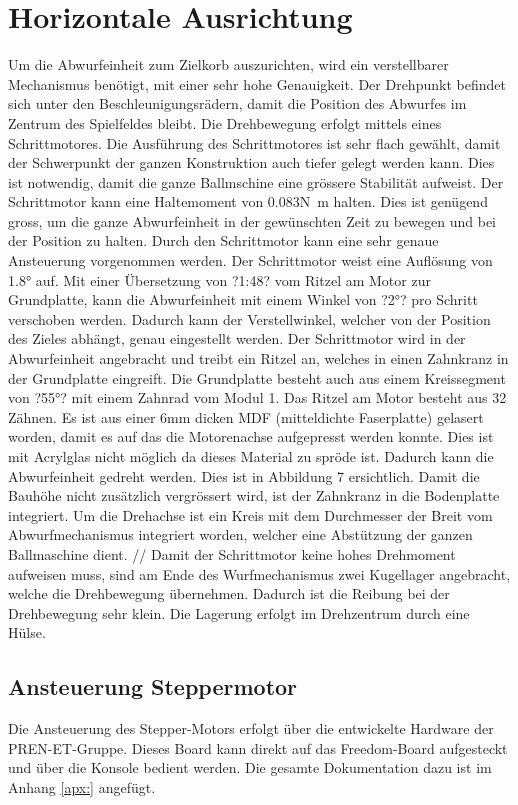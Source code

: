 \section{Horizontale Ausrichtung}

Um die Abwurfeinheit zum Zielkorb auszurichten, wird ein verstellbarer Mechanismus benötigt, mit einer sehr hohe Genauigkeit. Der Drehpunkt befindet sich unter den Beschleunigungsrädern, damit die Position des Abwurfes im Zentrum des Spielfeldes bleibt. Die Drehbewegung erfolgt mittels eines Schrittmotores. Die Ausführung des Schrittmotores ist sehr flach gewählt, damit der Schwerpunkt der ganzen Konstruktion auch tiefer gelegt werden kann. Dies ist notwendig, damit die ganze Ballmschine eine grössere Stabilität aufweist. Der Schrittmotor kann eine Haltemoment von 0.083\si{\newton\meter} halten. Dies ist genügend gross, um die ganze Abwurfeinheit in der gewünschten Zeit zu bewegen und bei der Position zu halten. Durch den Schrittmotor kann eine sehr genaue Ansteuerung vorgenommen werden. Der Schrittmotor weist eine Auflösung von 1.8\si{\degree} auf. Mit einer Übersetzung von ?1:48? vom Ritzel am Motor zur Grundplatte, kann die Abwurfeinheit mit einem Winkel von ?2°? pro Schritt verschoben werden. Dadurch kann der Verstellwinkel, welcher von der Position des Zieles abhängt, genau eingestellt werden. Der Schrittmotor wird in der Abwurfeinheit angebracht und treibt ein Ritzel an, welches in einen Zahnkranz in der Grundplatte eingreift. Die Grundplatte besteht auch aus einem Kreissegment von ?55°? mit einem Zahnrad vom Modul 1. Das Ritzel am Motor besteht aus 32 Zähnen. Es ist aus einer 6\si{\milli\meter} dicken MDF (mitteldichte Faserplatte) gelasert worden, damit es auf das die Motorenachse aufgepresst werden konnte. Dies ist mit Acrylglas nicht möglich da dieses Material zu spröde ist. Dadurch kann die Abwurfeinheit gedreht werden. Dies ist in Abbildung 7 ersichtlich. Damit die Bauhöhe nicht zusätzlich vergrössert wird, ist der Zahnkranz in die Bodenplatte integriert. Um die Drehachse ist ein Kreis mit dem Durchmesser der Breit vom Abwurfmechanismus integriert worden, welcher eine Abstützung der ganzen Ballmaschine dient.  //
Damit der Schrittmotor keine hohes Drehmoment aufweisen muss, sind am Ende des Wurfmechanismus zwei Kugellager angebracht, welche die Drehbewegung übernehmen. Dadurch ist die Reibung bei der Drehbewegung sehr klein. Die Lagerung erfolgt im Drehzentrum durch eine Hülse.



 \subsection{Ansteuerung Steppermotor}

    Die Ansteuerung des Stepper-Motors erfolgt über die entwickelte Hardware der PREN-ET-Gruppe. Dieses Board kann direkt auf das Freedom-Board aufgesteckt und über die Konsole bedient werden. Die gesamte Dokumentation dazu ist im Anhang \ref{apx:} angefügt.
    
    
\newpage